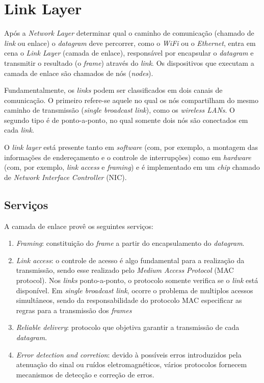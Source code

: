 \hypertarget{link-layer}{%
\chapter{Link Layer}\label{link-layer}}

Após a \emph{Network Layer} determinar qual o caminho de comunicação
(chamado de \emph{link} ou enlace) o \emph{datagram} deve percorrer, como
o \emph{WiFi} ou o \emph{Ethernet}, entra em cena o \emph{Link Layer}
(camada de enlace), responsável por encapsular o \emph{datagram} e
transmitir o resultado (o \emph{frame}) através do \emph{link}. Os
dispositivos que executam a camada de enlace são chamados de nós
(\emph{nodes}).

Fundamentalmente, os \emph{links} podem ser classificados em dois canais
de comunicação. O primeiro refere-se aquele no qual os nós compartilham
do mesmo caminho de transmissão (\emph{single broadcast link}), como os
\emph{wireless LANs}. O segundo tipo é de ponto-a-ponto, no qual somente
dois nós são conectados em cada \emph{link}.

O \emph{link layer} está presente tanto em \emph{software} (com, por
exemplo, a montagem das informações de endereçamento e o controle de
interrupções) como em \emph{hardware} (com, por exemplo, \emph{link
access} e \emph{framing}) e é implementado em um \emph{chip} chamado de
\emph{Network Interface Controller} (NIC).

\hypertarget{serviuxe7os}{%
\section{Serviços}\label{serviuxe7os}}

A camada de enlace provê os seguintes serviços:


\begin{enumerate}
\def\labelenumi{\arabic{enumi}.}
\tightlist
\item
  \emph{Framing}: constituição do \emph{frame} a partir do
  encapsulamento do \emph{datagram}.
\item
  \emph{Link access}: o controle de acesso é algo fundamental para a
  realização da transmissão, sendo esse realizado pelo \emph{Medium
  Access Protocol} (MAC protocol). Nos \emph{links} ponto-a-ponto, o
  protocolo somente verifica se o \emph{link} está disponível. Em
  \emph{single broadcast link}, ocorre o problema de multiplos acessos
  simultâneos, sendo da responsabilidade do protocolo MAC especificar as
  regras para a transmissão dos \emph{frames}
\item
  \emph{Reliable delivery}: protocolo que objetiva garantir a transmissão
  de cada \emph{datagram}.
\item
  \emph{Error detection and corretion}: devido à possíveis erros
  introduzidos pela atenuação do sinal ou ruídos eletromagnéticos,
  vários protocolos fornecem mecanismos de detecção e correção de erros.
\end{enumerate}

